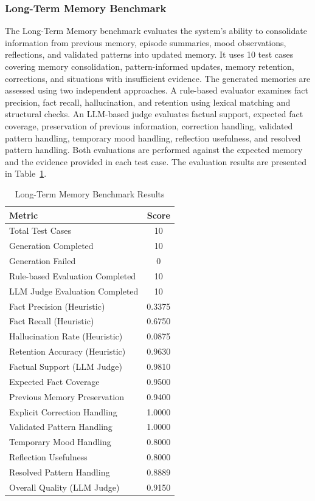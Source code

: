 \documentclass[conference]{IEEEtran}
\begin{document}
\subsubsection{Long-Term Memory Benchmark}
The Long-Term Memory benchmark evaluates the system's ability to consolidate information from previous memory, episode summaries, mood observations, reflections, and validated patterns into updated memory. It uses 10 test cases covering memory consolidation, pattern-informed updates, memory retention, corrections, and situations with insufficient evidence. The generated memories are assessed using two independent approaches. A rule-based evaluator examines fact precision, fact recall, hallucination, and retention using lexical matching and structural checks. An LLM-based judge evaluates factual support, expected fact coverage, preservation of previous information, correction handling, validated pattern handling, temporary mood handling, reflection usefulness, and resolved pattern handling. Both evaluations are performed against the expected memory and the evidence provided in each test case. The evaluation results are presented in Table~\ref{tab:long_term_memory}.
\begin{table}[!ht]
\centering
\footnotesize
\renewcommand{\arraystretch}{1.4}
\setlength{\tabcolsep}{7pt}
\begin{tabular}{|l|c|}
\hline
\textbf{Metric} & \textbf{Score} \\ \hline
Total Test Cases & 10 \\ \hline
Generation Completed & 10 \\ \hline
Generation Failed & 0 \\ \hline
Rule-based Evaluation Completed & 10 \\ \hline
LLM Judge Evaluation Completed & 10 \\ \hline
Fact Precision (Heuristic) & 0.3375 \\ \hline
Fact Recall (Heuristic) & 0.6750 \\ \hline
Hallucination Rate (Heuristic) & 0.0875 \\ \hline
Retention Accuracy (Heuristic) & 0.9630 \\ \hline
Factual Support (LLM Judge) & 0.9810 \\ \hline
Expected Fact Coverage & 0.9500 \\ \hline
Previous Memory Preservation & 0.9400 \\ \hline
Explicit Correction Handling & 1.0000 \\ \hline
Validated Pattern Handling & 1.0000 \\ \hline
Temporary Mood Handling & 0.8000 \\ \hline
Reflection Usefulness & 0.8000 \\ \hline
Resolved Pattern Handling & 0.8889 \\ \hline
Overall Quality (LLM Judge) & 0.9150 \\ \hline
\end{tabular}
\renewcommand{\arraystretch}{1}
\setlength{\tabcolsep}{6pt}
\caption{Long-Term Memory Benchmark Results}
\label{tab:long_term_memory}
\end{table}
\end{document}
